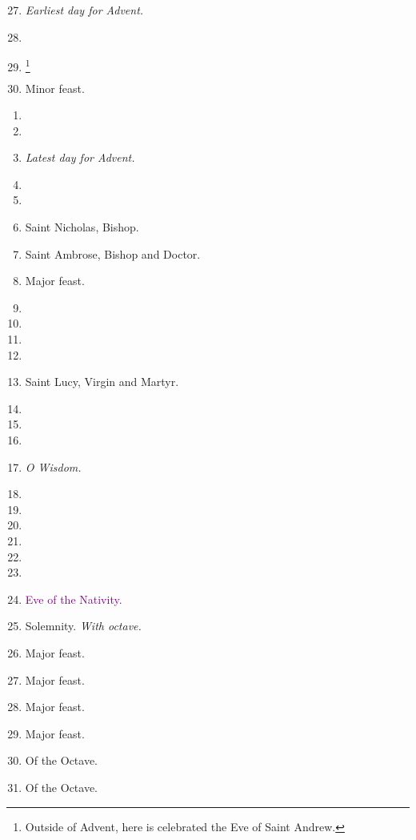 		\begin{enumerate}
			\setcounter{enumi}{26}
			\item {\textit{\small Earliest day for Advent.}}
			\item %
			\item \footnote{Outside of Advent, here is celebrated the Eve of Saint Andrew.}
			\item {} Minor feast.
		\end{enumerate}
		\begin{enumerate}
			\item %
			\item %
			\item \textit{\small Latest day for Advent.} %
			\item  %
			\item %
			\item Saint Nicholas, Bishop. 
			\item Saint Ambrose, Bishop and Doctor. 
			\item {} Major feast.
			\item %
			\item %
			\item %
			\item  %
			\item Saint Lucy, Virgin and Martyr. 
			\item  %
			\item %
			\item %
			\item {\textit{\small O Wisdom.}} %
			\item  %
			\item  %
			\item  %
			\item %
			\item  %
			\item  %
			\item \textcolor{purple}{Eve of the Nativity.} 
			\item \textbf{} Solemnity. \textit{With octave.}
			\item {} Major feast.
			\item {} Major feast.
			\item {} Major feast.
			\item {} Major feast.
			\item Of the Octave.  %
			\item Of the Octave. 
		\end{enumerate}
